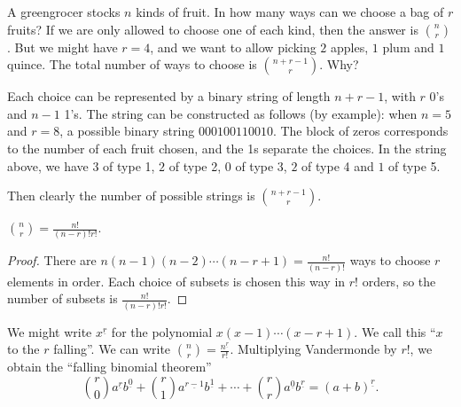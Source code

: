 \documentclass[a4paper]{article}
\begin{document}
\begin{eg}
  A greengrocer stocks $n$ kinds of fruit. In how many ways can we choose a bag of $r$ fruits? If we are only allowed to choose one of each kind, then the answer is $\binom{n}{r}$. But we might have $r = 4$, and we want to allow picking $2$ apples, $1$ plum and $1$ quince. The total number of ways to choose is $\binom{n + r - 1}{r}$. Why?

  Each choice can be represented by a binary string of length $n + r - 1$, with $r$ 0's and $n - 1$ 1's. The string can be constructed as follows (by example): when $n = 5$ and $r=8$, a possible binary string $000100110010$. The block of zeros corresponds to the number of each fruit chosen, and the 1s separate the choices. In the string above, we have $3$ of type 1, $2$ of type 2, $0$ of type 3, $2$ of type 4 and $1$ of type 5.

  Then clearly the number of possible strings is $\binom{n + r - 1}{r}$.
\end{eg}

\begin{prop}
  $\displaystyle\binom{n}{r} = \frac{n!}{(n - r)!r!}$.
\end{prop}

\begin{proof}
  There are $n(n - 1)(n - 2)\cdots (n - r + 1) = \frac{n!}{(n - r)!}$ ways to choose $r$ elements in order. Each choice of subsets is chosen this way in $r!$ orders, so the number of subsets is $\frac{n!}{(n - r)!r!}$.
\end{proof}

We might write $x^{\underline{r}}$ for the polynomial $x(x - 1)\cdots (x - r + 1)$. We call this ``$x$ to the $r$ falling''. We can write $\displaystyle \binom{n}{r} = \frac{n^{\underline{r}}}{r!}$. Multiplying Vandermonde by $r!$, we obtain the ``falling binomial theorem''
\[
  \binom{r}{0}a^{\underline{r}}b^{\underline{0}} + \binom{r}{1}a^{\underline{r - 1}}b^{\underline{1}} + \cdots + \binom{r}{r}a^{\underline{0}}b^{\underline{r}} = (a + b)^{\underline{r}}.
\]
\end{document}

